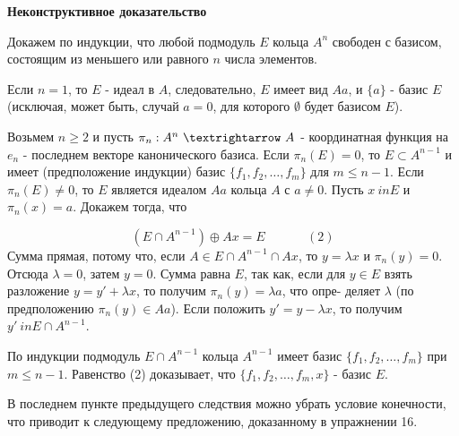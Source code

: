 \documentclass{mai_book}
\begin{document}
	\noindent
	{\bf Неконструктивное доказательство}
	
	Докажем по индукции, что любой подмодуль $E$ кольца $A^{n}$ свободен\linebreak
	с базисом, состоящим из меньшего или равного $n$ числа элементов.
	
	Если $n = 1$, то $E$ - идеал в $A$, следовательно, $E$ имеет вид $Aa$, и\linebreak
	$\{a\}$ - базис $E$ (исключая, может быть, случай $a = 0$, для которого $\emptyset$\linebreak
	будет базисом $E$).
	
	Возьмем $n\geqslant 2$ и пусть $\pi_{n}:A^{n} \ \textrightarrow \ A$ - координатная функция\linebreak
	на $e_n$ - последнем векторе канонического базиса. Если $\pi_{n}(E) = 0$, то\linebreak
	$E\subset A^{n - 1}$ и  имеет (предположение индукции) базис $\{f_1, f_2, \ldots, f_m\}$ для\linebreak
	$m\leqslant n - 1$. Если $\pi_{n}(E) \neq 0$, то $E$ является идеалом $Aa$ кольца $A$ с $a \neq 0$.\linebreak
	Пусть $x \ in E$ и $\pi_{n}(x) = a$. Докажем тогда, что
	
	$$(E \cap A^{n - 1}) \oplus Ax = E \ \ \ \ \ \ \ \ \ \ \ \ \ \ \ (2)$$
	Сумма прямая, потому что, если $A \in E \cap A^{n - 1} \cap Ax$, то $y = \lambda x$ и\linebreak
	$\pi_{n}(y) = 0$. Отсюда $\lambda = 0$, затем $y = 0$. Сумма равна $E$, так как, если для\linebreak
	$y \in E$ взять разложение $y = y' + \lambda x$, то получим $\pi_{n}(y) = \lambda a$, что опре-\linebreak
	деляет $\lambda$ (по предположению $\pi_{n}(y) \in Aa$). Если положить $y' = y - \lambda x$,\linebreak
	то получим $y' \ in E \cap A^{n - 1}$.
	
	По индукции подмодуль $E \cap A^{n - 1}$ кольца $A^{n - 1}$ имеет базис\linebreak
	$\{f_1, f_2, \ldots, f_m\}$ при $m \leqslant n - 1$. Равенство (2) доказывает, что\linebreak
	$\{f_1, f_2, \ldots, f_m, x\}$ - базис $E$.
	
	В последнем пункте предыдущего следствия можно убрать условие\linebreak
	конечности, что приводит к следующему предложению, доказанному в\linebreak
	упражнении 16.
	
\end{document}
